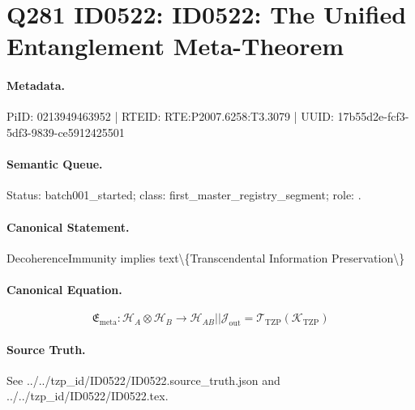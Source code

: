\section*{Q281 ID0522: ID0522: The Unified Entanglement Meta-Theorem}
\paragraph{Metadata.}
PiID: 0213949463952 | RTEID: RTE:P2007.6258:T3.3079 | UUID: 17b55d2e-fcf3-5df3-9839-ce5912425501

\paragraph{Semantic Queue.}
Status: batch001\_started; class: first\_master\_registry\_segment; role: .

\paragraph{Canonical Statement.}
DecoherenceImmunity implies text\textbackslash{}\{Transcendental Information Preservation\textbackslash{}\}

\paragraph{Canonical Equation.}
\[
\mathfrak{E}_{\mathrm{meta}}:\mathcal{H}_A\otimes\mathcal{H}_B\longrightarrow \mathcal{H}_{AB} || \mathcal{J}_{\mathrm{out}}=\mathcal{T}_{\mathrm{TZP}}\!\left(\mathcal{K}_{\mathrm{TZP}}\right)
\]

\paragraph{Source Truth.}
See ../../tzp\_id/ID0522/ID0522.source\_truth.json and ../../tzp\_id/ID0522/ID0522.tex.
